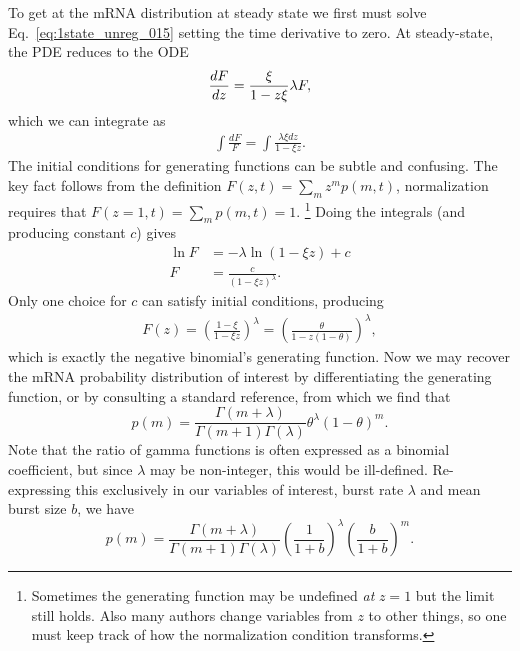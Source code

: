 To get at the mRNA distribution at steady state we first must solve
Eq.~\ref{eq:1state_unreg_015} setting the time derivative to zero. At
steady-state, the PDE reduces to the ODE
\begin{align}
\deriv[F]{z} = \frac{\xi}{1-z\xi}\lambda F,
\end{align}
which we can integrate as
\begin{align}
\int \frac{dF}{F} = \int \frac{\lambda\xi dz}{1-\xi z}.
\end{align}
The initial conditions for generating functions can be subtle and confusing. The
key fact follows from the definition
$F(z,t) = \sum_m z^m p(m,t)$,
normalization requires that
$F(z=1, t) = \sum_m p(m,t) = 1$.
\footnote{
Sometimes the generating function may be undefined \textit{at} $z=1$ but the
limit still holds. Also many authors change variables from $z$ to other
things, so one must keep track of how the normalization condition transforms.
}
Doing the integrals (and producing constant $c$) gives
\begin{align}
\ln F &= -\lambda \ln(1-\xi z) + c
\\
F &= \frac{c}{(1-\xi z)^\lambda}.
\end{align}
Only one choice for $c$ can satisfy initial conditions, producing
\begin{align}
F(z) = \left(\frac{1-\xi}{1-\xi z}\right)^\lambda
        = \left(\frac{\theta}{1 - z(1-\theta)}\right)^\lambda,
\end{align}
which is exactly the negative binomial's generating function. Now we may recover
the mRNA probability distribution of interest by differentiating the generating
function, or by consulting a standard reference,
from which we find that
\begin{equation}
p(m) = \frac{\Gamma(m+\lambda)}{\Gamma(m+1)\Gamma(\lambda)}
        \theta^\lambda (1-\theta)^m.
\end{equation}
Note that the ratio of gamma functions is often expressed as a binomial
coefficient, but since $\lambda$ may be non-integer, this would be ill-defined.
Re-expressing this exclusively in our variables of interest, burst rate
$\lambda$ and mean burst size $b$, we have
\begin{equation}
p(m) = \frac{\Gamma(m+\lambda)}{\Gamma(m+1)\Gamma(\lambda)}
        \left(\frac{1}{1+b}\right)^\lambda
        \left(\frac{b}{1+b}\right)^m.
\label{eq:nbinom_deriv_final}
\end{equation}

